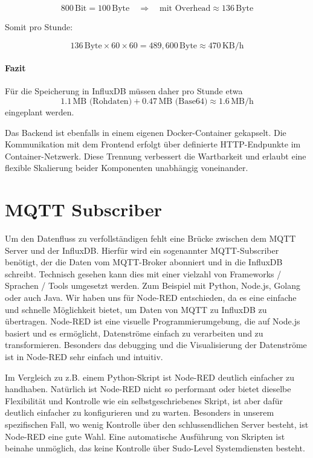 \[
800 \,\text{Bit} = 100 \,\text{Byte} \quad \Rightarrow \quad 
\text{mit Overhead} \approx 136 \,\text{Byte}
\]

Somit pro Stunde:  

\[
136 \,\text{Byte} \times 60 \times 60 
= 489{,}600 \,\text{Byte} \approx 470 \,\text{KB/h}
\]

\paragraph{Fazit}  
Für die Speicherung in InfluxDB müssen daher pro Stunde etwa  
\[
1.1\,\text{MB (Rohdaten)} + 0.47\,\text{MB (Base64)} \approx 1.6\,\text{MB/h}
\]  
eingeplant werden.


Das Backend ist ebenfalls in einem eigenen Docker-Container gekapselt. 
Die Kommunikation mit dem Frontend erfolgt über definierte HTTP-Endpunkte im Container-Netzwerk. 
Diese Trennung verbessert die Wartbarkeit und erlaubt eine flexible Skalierung beider Komponenten unabhängig voneinander.

\section{MQTT Subscriber}
Um den Datenfluss zu verfollständigen fehlt eine Brücke zwischen dem MQTT Server und der InfluxDB. 
Hierfür wird ein sogenannter MQTT-Subscriber benötigt, der die Daten vom MQTT-Broker abonniert und in die InfluxDB schreibt.
Technisch gesehen kann dies mit einer vielzahl von Frameworks / Sprachen / Tools umgesetzt werden. 
Zum Beispiel mit Python, Node.js, Golang oder auch Java.
Wir haben uns für Node-RED entschieden, da es eine einfache und schnelle Möglichkeit bietet, um Daten von MQTT zu InfluxDB zu übertragen.
Node-RED ist eine visuelle Programmierumgebung, die auf Node.js basiert und es ermöglicht, Datenströme einfach zu verarbeiten und zu transformieren.
Besonders das debugging und die Visualisierung der Datenströme ist in Node-RED sehr einfach und intuitiv.
\cite{nodered2023docs}

Im Vergleich zu z.B. einem Python-Skript ist Node-RED deutlich einfacher zu handhaben.
Natürlich ist Node-RED nicht so performant oder bietet dieselbe Flexibilität und Kontrolle wie ein selbstgeschriebenes Skript,
ist aber dafür deutlich einfacher zu konfigurieren und zu warten.
Besonders in unserem spezifischen Fall, wo wenig Kontrolle über den schlussendlichen Server besteht, ist Node-RED eine gute Wahl.
Eine automatische Ausführung von Skripten ist beinahe unmöglich, das keine Kontrolle über Sudo-Level Systemdiensten besteht.

